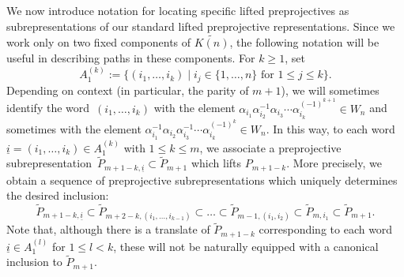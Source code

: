 \documentclass[smallextended,envcountsect,envcountsame]{svjour3}
\numberwithin{equation}{section}
\newcommand{\ui}{{\underline i}}
\begin{document}
We now introduce notation for locating specific lifted preprojectives as subrepresentations of our standard lifted preprojective representations.
Since we work only on two fixed components of $\widetilde{K(n)}$, the following notation will be useful in describing paths in these components.
For $k\ge1$, set
\[A_1^{(k)}:=\{(i_1,\ldots,i_k)\mid i_j\in\{1,\ldots,n\}\text{ for $1\le j\le k$}\}.\]
Depending on context (in particular, the parity of $m+1$), we will sometimes identify the word~$(i_1,\ldots,i_k)$ with the element $\alpha_{i_1}\alpha_{i_2}^{-1}\alpha_{i_3}\cdots\alpha_{i_k}^{(-1)^{k+1}}\in W_n$ and sometimes with the element $\alpha_{i_1}^{-1}\alpha_{i_2}\alpha_{i_3}^{-1}\cdots\alpha_{i_k}^{(-1)^k}\in W_n$.
In this way, to each word $\ui=(i_1,\ldots,i_k)\in A_1^{(k)}$ with $1\leq k\leq m$, we associate a preprojective subrepresentation~$\tilde P_{m+1-k,\ui}\subset\tilde P_{m+1}$ which lifts $P_{m+1-k}$.
More precisely, we obtain a sequence of preprojective subrepresentations which uniquely determines the desired inclusion:
\[\tilde P_{m+1-k,\ui}\subset\tilde P_{m+2-k,(i_1,\ldots,i_{k-1})}\subset\ldots\subset\tilde P_{m-1,(i_1,i_2)}\subset\tilde P_{m,i_1}\subset\tilde P_{m+1}.\]
Note that, although there is a translate of $\tilde P_{m+1-k}$ corresponding to each word $\ui\in A_1^{(l)}$ for $1\le l<k$, these will not be naturally equipped with a canonical inclusion to $\tilde P_{m+1}$.
\end{document}
